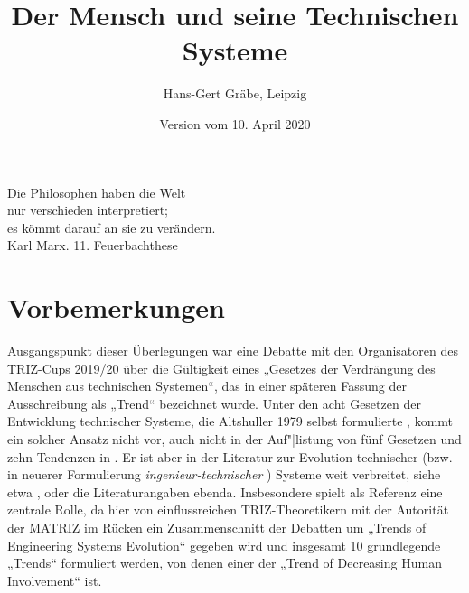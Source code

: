 \documentclass[11pt,a4paper]{article}
\title{Der Mensch und seine Technischen Systeme}
\author{Hans-Gert Gräbe, Leipzig}
\date{Version vom 10. April 2020}
\begin{document}
\maketitle

\begin{flushright}
  Die Philosophen haben die Welt\\ nur verschieden interpretiert;\\ es kömmt
  darauf an sie zu verändern.\\ Karl Marx. 11. Feuerbachthese
\end{flushright}
\section{Vorbemerkungen}

Ausgangspunkt dieser Überlegungen war eine Debatte mit den Organisatoren des
TRIZ-Cups 2019/20 über die Gültigkeit eines „Gesetzes der Verdrängung des
Menschen aus technischen Systemen“, das in einer späteren Fassung der
Ausschreibung als „Trend“ bezeichnet wurde. Unter den acht Gesetzen der
Entwicklung technischer Systeme, die Altshuller 1979 selbst formulierte
\cite[S. 122--127]{Altshuller1979}, kommt ein solcher Ansatz nicht vor, auch
nicht in der Auf"|listung von fünf Gesetzen und zehn Tendenzen in
\cite[S. 148\,ff.]{KoltzeSouchkov2017}.  Er ist aber in der Literatur zur
Evolution technischer (bzw. in neuerer Formulierung
\emph{ingenieur-technischer} \cite{TESE2018}) Systeme weit verbreitet, siehe
etwa \cite[2.24]{Goldovsky1983}, \cite{TESE2018} oder die Literaturangaben
ebenda.  Insbesondere \cite{TESE2018} spielt als Referenz eine zentrale Rolle,
da hier von einflussreichen TRIZ-Theoretikern mit der Autorität der MATRIZ im
Rücken ein Zusammenschnitt der Debatten um „Trends of Engineering Systems
Evolution“ gegeben wird und insgesamt 10 grundlegende „Trends“ formuliert
werden, von denen einer der „Trend of Decreasing Human Involvement“
\cite[4.8]{TESE2018} ist.
\end{document}
